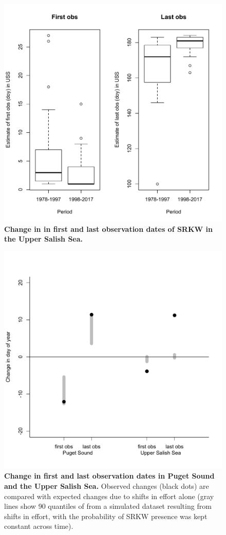 \documentclass{article}
\begin{document}
 \begin{figure}[p]
\includegraphics{../analyses/orcaphen/figures/boxplots_1978_2017_uss.pdf} 
\caption{\textbf{Change in in first and last observation dates of SRKW in the Upper Salish Sea.} }
 \label{fig:boxplot2}
 \end{figure}
 
\begin{figure}[p]
\includegraphics{../analyses/orcaphen/figures/simvdata_1978_2017.pdf} 
\caption{\textbf{Change in first and last observation dates in Puget Sound and the Upper Salish Sea.} Observed changes (black dots) are compared with expected changes due to shifts in effort alone (gray lines show 90 quantiles of from a simulated dataset resulting from shifts in effort, with the probability of SRKW presence was kept constant across time).}
 \label{fig:sim}
 \end{figure}
 
\end{document}
